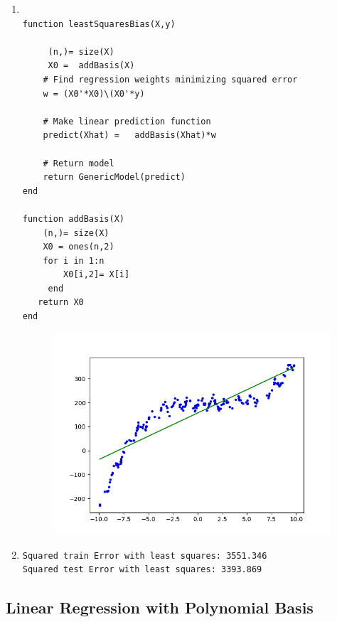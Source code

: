 \documentclass{article}
\begin{document}
\begin{enumerate}


\item \begin{verbatim}

function leastSquaresBias(X,y)

     (n,)= size(X)
     X0 =  addBasis(X)
    # Find regression weights minimizing squared error
    w = (X0'*X0)\(X0'*y)

    # Make linear prediction function
    predict(Xhat) =   addBasis(Xhat)*w

    # Return model
    return GenericModel(predict)
end

function addBasis(X)
    (n,)= size(X)
    X0 = ones(n,2)
    for i in 1:n
        X0[i,2]= X[i]
     end 
   return X0
end 

 \end{verbatim}


\begin{figure}[h!]
  \includegraphics[width=30em,height=7.5cm]{a2_q4_3.png}

\end{figure}


\item
 \begin{verbatim}
Squared train Error with least squares: 3551.346
Squared test Error with least squares: 3393.869
 \end{verbatim}


\end{enumerate}




\subsection{Linear Regression with Polynomial Basis}
\end{document}
